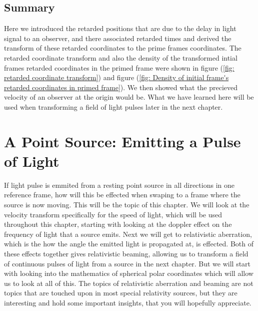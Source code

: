 

\section{Summary}

Here we introduced the retarded positions that are due to the delay in light signal to an observer, and there associated retarded times and derived the transform of these retarded coordinates to the prime frames coordinates.
The retarded coordinate transform and also the density of the transformed intial frames retarded coordinates in the primed frame were shown in figure (\ref{fig: retarded coordinate transform}) and figure (\ref{fig: Density of initial frame's retarded coordinates in primed frame}).
We then showed what the precieved velocity of an observer at the origin would be.
What we have learned here will be used when transforming a field of light pulses later in the next chapter.



\printbibliography[segment=\therefsegment, heading=subbibliography]


\chapter{A Point Source: Emitting a Pulse of Light} \label{ch: A Point Source Emitting a Pulse of Light}

If light pulse is emmited from a resting point source in all directions in one reference frame, how will this be effected when swaping to a frame where the source is now moving.
This will be the topic of this chapter.
We will look at the velocity transform specifically for the speed of light, which will be used throughout this chapter, starting with looking at the doppler effect on the frequency of light that a source emits.
Next we will get to relativistic aberration, which is the how the angle the emitted light is propagated at, is effected.
Both of these effects together gives relativistic beaming, allowing us to transform a field of continuous pulses of light from a source in the next chapter.
But we will start with looking into the mathematics of spherical polar coordinates which will allow us to look at all of this.
The topics of relativistic aberration and beaming are not topics that are touched upon in most special relativity sources, but they are interesting and hold some important insights, that you will hopefully appreciate.

